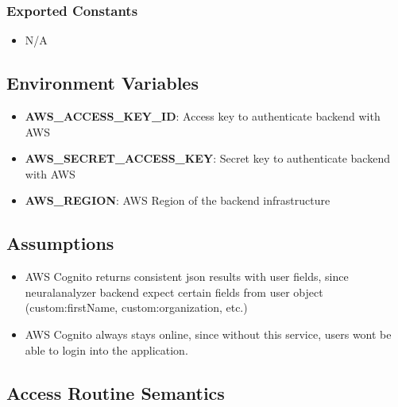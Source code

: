 \documentclass[12pt, titlepage]{article}
\begin{document}
\subsubsection{Exported Constants}
\begin{itemize}
    \item N/A
\end{itemize}

\subsection{Environment Variables}
\begin{itemize}
    \item \textbf{AWS\_ACCESS\_KEY\_ID}: Access key to authenticate backend with AWS
    \item \textbf{AWS\_SECRET\_ACCESS\_KEY}: Secret key to authenticate backend with AWS
    \item \textbf{AWS\_REGION}: AWS Region of the backend infrastructure
\end{itemize}

\subsection{Assumptions}
\begin{itemize}
    \item AWS Cognito returns consistent json results with user fields, since neuralanalyzer backend expect certain fields from user object (custom:firstName, custom:organization, etc.)
    \item AWS Cognito always stays online, since without this service, users wont be able to login into the application.
\end{itemize}

\subsection{Access Routine Semantics}
\end{document}
